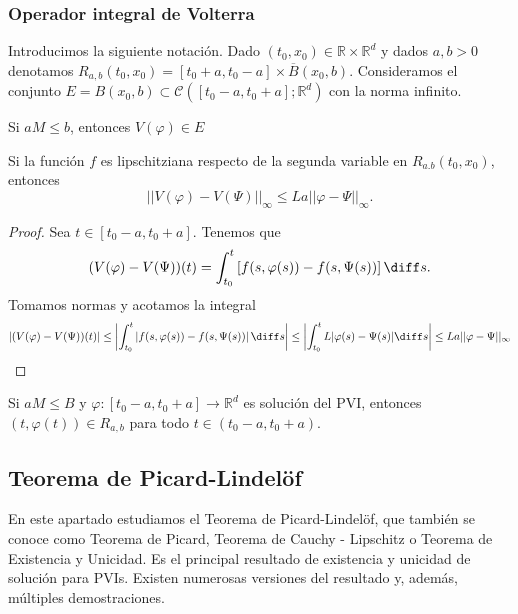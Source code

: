 \documentclass{article}
\begin{document}
\subsubsection{Operador integral de Volterra}

Introducimos la siguiente notación. Dado $(t_0, x_0) \in \mathbb{R} \times \mathbb{R}^d$ y dados
$a,b > 0$ denotamos $R_{a,b}(t_0, x_0) = [t_0+a, t_0-a] \times \overline{B}(x_0, b)$. Consideramos
el conjunto $E = B(x_0, b) \subset \mathcal{C}([t_0-a, t_0+a]; \mathbb{R}^d)$ con la norma infinito.

\begin{lem}
  Si $aM \le b$, entonces $V(\varphi) \in E$
\end{lem}

\begin{lem}
  Si la función $f$ es lipschitziana respecto de la segunda variable en $R_{a.b}(t_0, x_0)$,
  entonces
  \[||V(\varphi) - V(\Psi)||_{\infty} \le La||\varphi - \Psi||_\infty.\]
\end{lem}

\begin{proof}
  Sea $t \in [t_0-a, t_0+a]$. Tenemos que
  \[ (V(\varphi) - V(\Psi))(t) = \int_{t_{0}}^t \left[f(s, \varphi(s)) - f(s, \Psi(s))\right] \diff
    s.\] Tomamos normas y acotamos la integral
  \[|(V(\varphi) - V(\Psi))(t)| \le \left|\int_{t_{0}}^t \left|f(s, \varphi(s)) - f(s,
        \Psi(s))\right| \diff s\right| \le \left|\int_{t_{0}}^t L |\varphi(s) - \Psi(s)| \diff s
    \right| \le L a ||\varphi - \Psi||_{\infty}\] \qedhere
\end{proof}

\begin{rem}
  Si $a M \le B$ y $\varphi: [t_0-a, t_0+a] \to \mathbb{R}^d$ es solución del PVI, entonces
  $(t, \varphi(t)) \in R_{a,b}$ para todo $t \in (t_0-a, t_0+a)$.
\end{rem}

\subsection{Teorema de Picard-Lindelöf}

En este apartado estudiamos el Teorema de Picard-Lindelöf, que también se conoce como Teorema de
Picard, Teorema de Cauchy - Lipschitz o Teorema de Existencia y Unicidad. Es el principal resultado
de existencia y unicidad de solución para PVIs. Existen numerosas versiones del resultado y, además,
múltiples demostraciones.
\end{document}
